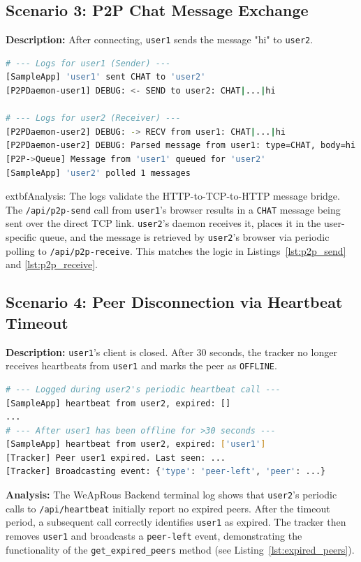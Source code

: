 \subsection{Scenario 3: P2P Chat Message Exchange}
\textbf{Description:} After connecting, \texttt{user1} sends the message "hi" to \texttt{user2}.

\begin{lstlisting}[language=bash, caption={Actual Logs for P2P Message Exchange}, label={lst:log_messaging_actual}]
# --- Logs for user1 (Sender) ---
[SampleApp] 'user1' sent CHAT to 'user2'
[P2PDaemon-user1] DEBUG: <- SEND to user2: CHAT|...|hi

# --- Logs for user2 (Receiver) ---
[P2PDaemon-user2] DEBUG: -> RECV from user1: CHAT|...|hi
[P2PDaemon-user2] DEBUG: Parsed message from user1: type=CHAT, body=hi
[P2P->Queue] Message from 'user1' queued for 'user2'
[SampleApp] 'user2' polled 1 messages
\end{lstlisting}
	extbf{Analysis:} The logs validate the HTTP-to-TCP-to-HTTP message bridge. The \texttt{/api/p2p-send} call from \texttt{user1}'s browser results in a \texttt{CHAT} message being sent over the direct TCP link. \texttt{user2}'s daemon receives it, places it in the user-specific queue, and the message is retrieved by \texttt{user2}'s browser via periodic polling to \texttt{/api/p2p-receive}. This matches the logic in Listings~\ref{lst:p2p_send} and \ref{lst:p2p_receive}.

\subsection{Scenario 4: Peer Disconnection via Heartbeat Timeout}
\textbf{Description:} \texttt{user1}'s client is closed. After 30 seconds, the tracker no longer receives heartbeats from \texttt{user1} and marks the peer as \texttt{OFFLINE}.

\begin{lstlisting}[language=bash, caption={Actual Logs for Heartbeat Timeout}, label={lst:log_timeout_actual}]
# --- Logged during user2's periodic heartbeat call ---
[SampleApp] heartbeat from user2, expired: []
...
# --- After user1 has been offline for >30 seconds ---
[SampleApp] heartbeat from user2, expired: ['user1']
[Tracker] Peer user1 expired. Last seen: ...
[Tracker] Broadcasting event: {'type': 'peer-left', 'peer': ...}
\end{lstlisting}
\textbf{Analysis:} The {WeApRous Backend} terminal log shows that \texttt{user2}'s periodic calls to \texttt{/api/heartbeat} initially report no expired peers. After the timeout period, a subsequent call correctly identifies \texttt{user1} as expired. The tracker then removes \texttt{user1} and broadcasts a \texttt{peer-left} event, demonstrating the functionality of the \texttt{get\_expired\_peers} method (see Listing~\ref{lst:expired_peers}).